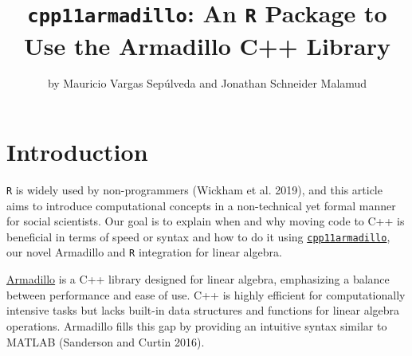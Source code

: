\title{\texttt{cpp11armadillo}: An \texttt{R} Package to Use the Armadillo C++ Library}


\author{by Mauricio Vargas Sepúlveda and Jonathan Schneider Malamud}

\maketitle


\hypertarget{introduction}{%
\section{Introduction}\label{introduction}}

\texttt{R} is widely used by non-programmers (Wickham et al. 2019), and this article aims to
introduce computational concepts in a non-technical yet formal manner for social
scientists. Our goal is to explain when and why moving code to C++ is
beneficial in terms of speed or syntax and how to do it using
\href{https://pacha.dev/cpp11armadillo}{\texttt{cpp11armadillo}}, our novel Armadillo and \texttt{R}
integration for linear algebra.

\href{https://arma.sourceforge.net/}{Armadillo} is a C++ library designed for
linear algebra, emphasizing a balance between performance and ease of use.
C++ is highly efficient for computationally intensive tasks but lacks built-in
data structures and functions for linear algebra operations. Armadillo fills
this gap by providing an intuitive syntax similar to MATLAB (Sanderson and Curtin 2016).

